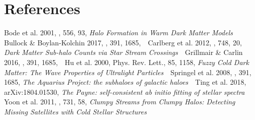 \documentclass[12pt]{article}
\begin{document}
\section*{References}\vskip-0.2in
{\small

Bode et al. 2001, \apj, 556, 93, \emph{Halo Formation in Warm Dark Matter Models} \,\textbullet\,
Bullock \& Boylan-Kolchin 2017, \araa, 391, 1685, \emph{} \,\textbullet\,
Carlberg et al. 2012, \apj, 748, 20, \emph{Dark Matter Sub-halo Counts via Star Stream Crossings} \,\textbullet\,
Grillmair \& Carlin 2016, \mnras, 391, 1685, \emph{} \,\textbullet\,
Hu et al. 2000, Phys. Rev. Lett., 85, 1158, \emph{Fuzzy Cold Dark Matter: The Wave Properties of Ultralight Particles} \,\textbullet\,
Springel et al. 2008, \mnras, 391, 1685, \emph{The Aquarius Project: the subhaloes of galactic haloes} \,\textbullet\,
Ting et al. 2018, arXiv:1804.01530, \emph{The Payne: self-consistent ab initio fitting of stellar spectra} \,\textbullet\,
Yoon et al. 2011, \apj, 731, 58, \emph{Clumpy Streams from Clumpy Halos: Detecting Missing Satellites with Cold Stellar Structures}
}
\end{document}
